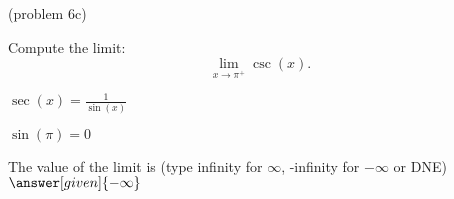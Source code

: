 \documentclass{ximera}
\begin{document}
\begin{problem}(problem 6c)
  
	Compute the limit:
  \[
  \lim_{x \to {\pi^+}} \csc(x).
  \]
		\begin{hint}
		  $\sec(x) = \frac{1}{\sin(x)}$
		\end{hint}	
		\begin{hint}
		  $\sin(\pi) = 0$
		\end{hint}
		The value of the limit is
		(type infinity for $\infty$, -infinity for $-\infty$ or DNE)
		 $\answer[given]{-\infty}$
		
\end{problem}


\begin{center}
\begin{foldable}
\end{foldable}
\end{center}
\end{document}
